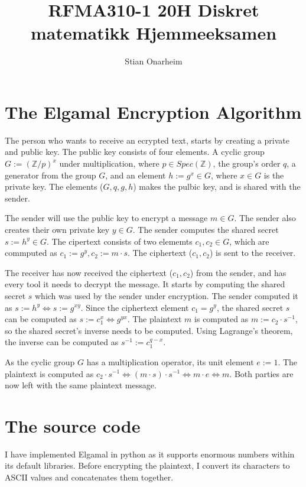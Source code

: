 \documentclass{article}
\author{Stian Onarheim}
\title{RFMA310-1 20H Diskret matematikk Hjemmeeksamen}
\begin{document}
\maketitle
\newpage
\tableofcontents
\newpage

\section{The Elgamal Encryption Algorithm}
The person who wants to receive an ecrypted text, starts by creating a private and public key. The public key consists of four elements. A cyclic group $G := (\mathbb{Z}/p)^x$ under multiplication, where $p \in Spec(\mathbb{Z})$, the group's order $q$, a generator from the group $G$, and an element $h := g^x \in G$, where $x \in G$ is the private key. The elements ($G, q, g, h$) makes the pulbic key, and is shared with the sender.

The sender will use the public key to encrypt a message $m \in G$. The sender also creates their own private key $y \in G$. The sender computes the shared secret $s := h^y \in G$. The cipertext consists of two elememts $c_1, c_2 \in G$, which are commputed as $c_1 := g^y, c_2 := m \cdot s$. The ciphertext ($c_1,c_2$) is sent to the receiver.

The receiver has now received the ciphertext ($c_1, c_2$) from the sender, and has every tool it needs to decrypt the message. It starts by computing the shared secret $s$ which was used by the sender under encryption. The sender computed it as $s := h^y \Leftrightarrow s:= g^{xy}$. Since the ciphertext element $c_1 = g^y$, the shared secret $s$ can be computed as $s := c_1^x \Leftrightarrow g^{yx}$. The plaintext $m$ is computed as $m := c_2 \cdot s^{-1}$, so the shared secret's inverse needs to be computed. Using Lagrange's theorem, the inverse can be computed as $s^{-1} := c_1^{q-x}$.

As the cyclic group $G$ has a multiplication operator, its unit element $e := 1$. The plaintext is computed as $c_2 \cdot s^{-1} \Leftrightarrow (m \cdot s) \cdot s^{-1} \Leftrightarrow m \cdot e \Leftrightarrow m$. Both parties are now left with the same plaintext message.

\section{The source code}
I have implemented Elgamal in python as it supports enormous numbers within its default libraries. Before encrypting the plaintext, I convert its characters to ASCII values and concatenates them together.\\
\end{document}
